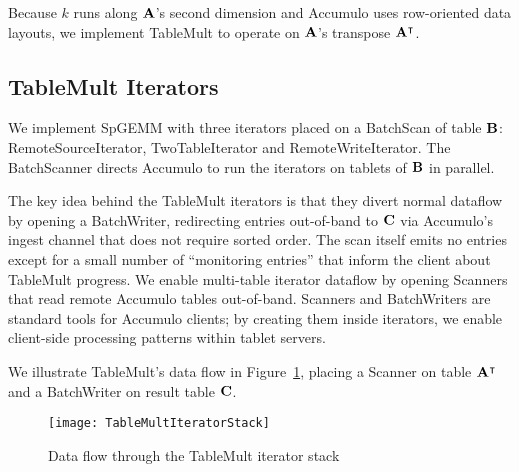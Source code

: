 Because $k$ runs along $\mathbf{A}$'s second dimension 
and Accumulo uses row-oriented data layouts, we implement 
TableMult to operate on $\mathbf{A}$'s transpose $\mathbf{A^{\intercal}}$.



\subsection{TableMult Iterators}
\label{sTableMult}

We implement SpGEMM with three iterators placed on a BatchScan of table $\mathbf{B}$:
RemoteSourceIterator, TwoTableIterator and RemoteWriteIterator.
The BatchScanner directs Accumulo to run the iterators on tablets of $\mathbf{B}$ in parallel.

The key idea behind the TableMult iterators is that they divert normal dataflow by opening a BatchWriter,
redirecting entries out-of-band to $\mathbf{C}$ via
Accumulo's ingest channel that does not require sorted order. 
The scan itself emits no entries except for a small number of ``monitoring entries'' 
that inform the client about TableMult progress.
We enable multi-table iterator dataflow by opening Scanners 
that read remote Accumulo tables out-of-band.
Scanners and BatchWriters are standard tools for Accumulo clients; 
by creating them inside iterators, we enable client-side processing patterns
within tablet servers.

We illustrate TableMult's data flow in Figure~\ref{fIteratorStackSpGEMM},
placing a Scanner on table $\mathbf{A^{\intercal}}$
and a BatchWriter on result table $\mathbf{C}$.

\begin{figure}[htb]
\vspace{-3pt}
\centering
\texttt{[image: TableMultIteratorStack]}
\vspace{-8pt}
\caption{Data flow through the TableMult iterator stack}
\label{fIteratorStackSpGEMM}
\vspace{-9pt}
\end{figure}

